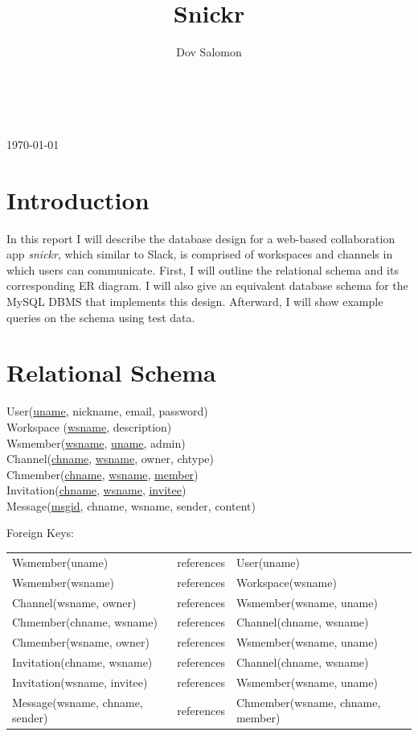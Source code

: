\documentclass{article}
\title{Snickr}
\author{Dov Salomon}
\renewcommand{\maketitle}{
\begin{center}
{\huge\bfseries\thetitle} \\
\vspace{3pt}
{\large\theauthor} \\
\vspace{3pt}
\today
\end{center}
}
\begin{document}
\maketitle

\section{Introduction}

In this report I will describe the database design for a web-based collaboration app \textit{snickr}, which similar to Slack, is comprised of workspaces and channels in which users can communicate. First, I will outline the relational schema and its corresponding ER diagram. I will also give an equivalent database schema for the MySQL DBMS that implements this design. Afterward, I will show example queries on the schema using test data.

\section{Relational Schema}
{
\ttfamily
\noindent
User(\underline{uname}, nickname, email, password) \\
Workspace (\underline{wsname}, description) \\
Wsmember(\underline{wsname}, \underline{uname}, admin) \\
Channel(\underline{chname}, \underline{wsname}, owner, chtype) \\
Chmember(\underline{chname}, \underline{wsname}, \underline{member}) \\
Invitation(\underline{chname}, \underline{wsname}, \underline{invitee}) \\
Message(\underline{msgid}, chname, wsname, sender, content)

\noindent
\textnormal{Foreign Keys:}

\begin{tabular}{lcl}
Wsmember(uname)                 & references & User(uname) \\
Wsmember(wsname)                & references & Workspace(wsname) \\
Channel(wsname, owner)          & references & Wsmember(wsname, uname) \\
Chmember(chname, wsname)        & references & Channel(chname, wsname) \\
Chmember(wsname, owner)         & references & Wsmember(wsname, uname) \\
Invitation(chname, wsname)      & references & Channel(chname, wsname) \\
Invitation(wsname, invitee)     & references & Wsmember(wsname, uname) \\
Message(wsname, chname, sender) & references & Chmember(wsname, chname, member) \\
\end{tabular}
}
\end{document}
